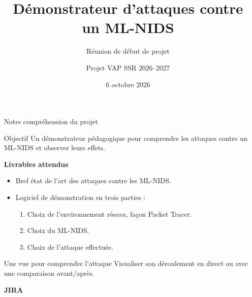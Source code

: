 \documentclass[aspectratio=169,11pt]{beamer}
\title[Démonstrateur ML-NIDS]{Démonstrateur d'attaques contre un ML-NIDS}
\subtitle{Réunion de début de projet}
\author{Projet VAP SSR 2026--2027}
\institute{Encadrant : Gregory Blanc}
\date{6 octobre 2026}
\begin{document}
\begin{frame}
  \titlepage
\end{frame}

\begin{frame}{Notre compréhension du projet}
  \begin{block}{Objectif}
    Un démonstrateur pédagogique pour comprendre les attaques contre un ML-NIDS
    et observer leurs effets.
  \end{block}
  \textbf{Livrables attendus}
  \begin{itemize}
    \setlength{\itemsep}{.8em}
    \item Bref état de l'art des attaques contre les ML-NIDS.
    \item Logiciel de démonstration en trois parties :
      \begin{enumerate}
        \setlength{\itemsep}{.5em}
        \item Choix de l'environnement réseau, façon Packet Tracer.
        \item Choix du ML-NIDS.
        \item Choix de l'attaque effectuée.
      \end{enumerate}
  \end{itemize}
  \vfill
  \begin{block}{Une vue pour comprendre l'attaque}
    Visualiser son déroulement en direct ou avec une comparaison avant/après.
  \end{block}
\end{frame}

\begin{frame}[plain]
  \centering
  {\fontsize{54}{64}\selectfont\bfseries\color{projectblue} JIRA\par}
\end{frame}
\end{document}
